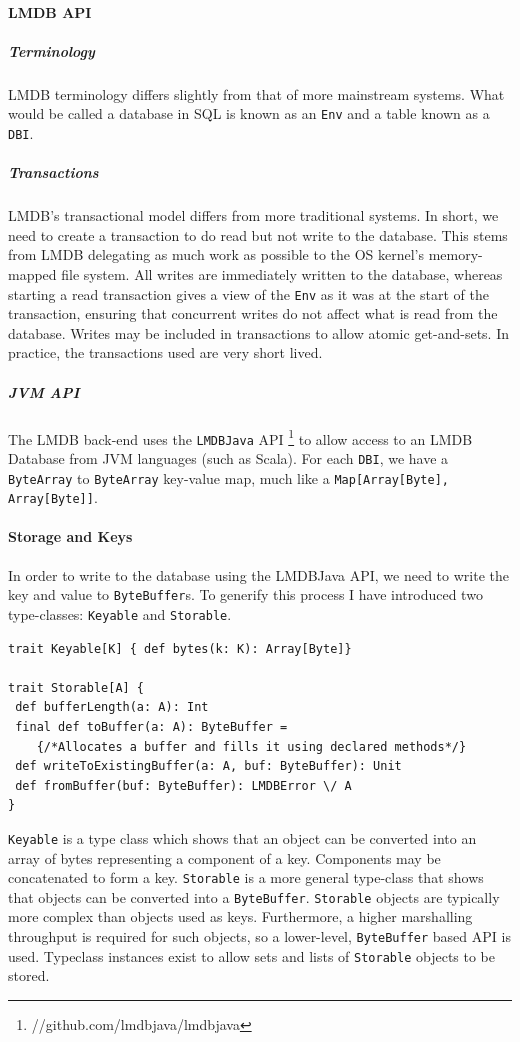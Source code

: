 \documentclass[12pt,a4paper,twoside,openright]{report}
\newcommand\codeName[1]{\texttt{#1}}
\newcommand\term[1]{\texttt{#1}}
\renewcommand{\baselinestretch}{1.1}    %
\let\oldparagraph\paragraph
\renewcommand{\paragraph}[1]{\oldparagraph{#1}\mbox{}}
\let\oldsubparagraph\subparagraph
\renewcommand{\subparagraph}[1]{\oldsubparagraph{#1}\mbox{}}
\begin{document}
		\paragraph{LMDB API}
			\subparagraph{Terminology}
			LMDB terminology differs slightly from that of more mainstream systems. What would be called a database in SQL is known as an \term{Env} and a table known as a \term{DBI}.
			\subparagraph{Transactions}
				LMDB's transactional model differs from more traditional systems. In short, we need to create a transaction to do read but not write to the database. This stems from LMDB delegating as much work as possible to the OS kernel's memory-mapped file system. All writes are immediately written to the database, whereas starting a read transaction gives a view of the \term{Env} as it was at the start of  the transaction, ensuring that concurrent writes do not affect what is read from the database. Writes may be included in transactions to allow atomic get-and-sets. In practice, the transactions used are very short lived.
			\subparagraph{JVM API}
			The LMDB back-end uses the \codeName{LMDBJava} API \footnote{//github.com/lmdbjava/lmdbjava} to allow access to an LMDB Database from JVM languages (such as Scala). For each \term{DBI}, we have a \codeName{ByteArray} to \codeName{ByteArray} key-value map, much like a \codeName{Map[Array[Byte], Array[Byte]]}.
			
		\paragraph{Storage and Keys}
			In order to write to the database using the LMDBJava API, we need to write the key and value to \codeName{ByteBuffer}s. To generify this process I have introduced two type-classes: \codeName{Keyable} and \codeName{Storable}.
			
\renewcommand{\baselinestretch}{0.8}
\begin{framed}
\begin{verbatim}
trait Keyable[K] { def bytes(k: K): Array[Byte]}

trait Storable[A] {
 def bufferLength(a: A): Int
 final def toBuffer(a: A): ByteBuffer = 
    {/*Allocates a buffer and fills it using declared methods*/}
 def writeToExistingBuffer(a: A, buf: ByteBuffer): Unit
 def fromBuffer(buf: ByteBuffer): LMDBError \/ A
}
\end{verbatim}
\end{framed}	
\renewcommand{\baselinestretch}{1.1}
		
\codeName{Keyable} is a type class which shows that an object can be converted into an array of bytes representing a component of a key. Components may be concatenated to form a key. \codeName{Storable} is a more general type-class that shows that objects can be converted into a \codeName{ByteBuffer}. \codeName{Storable} objects are typically more complex than objects used as keys. Furthermore, a higher marshalling throughput is required for such objects, so a lower-level, \codeName{ByteBuffer} based API is used. Typeclass instances exist to allow sets and lists of \codeName{Storable} objects to be stored.	
			
\end{document}
